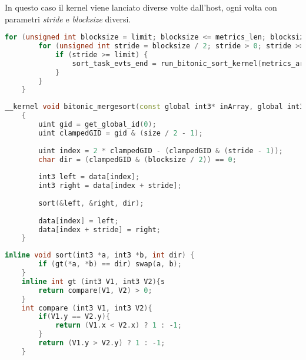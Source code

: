 In questo caso il kernel viene lanciato diverse volte dall'host, ogni volta con parametri \textit{stride} e \textit{blocksize} diversi.\\

\begin{lstlisting}[language=C++, caption={Bitonic mergesort codice host},captionpos=b]
	for (unsigned int blocksize = limit; blocksize <= metrics_len; blocksize <<= 1) {
		for (unsigned int stride = blocksize / 2; stride > 0; stride >>= 1) {
			if (stride >= limit) {
				sort_task_evts_end = run_bitonic_sort_kernel(metrics_array_len, stride, blocksize);
			}
		}
	}
\end{lstlisting}

\begin{lstlisting}[language=C++, caption={bitonic\_mergesort kernel, source: \url{https://github.com/Gram21/GPUSorting}},captionpos=b]
	__kernel void bitonic_mergesort(const global int3* inArray, global int3* outArray, const uint size, const uint blocksize, const uint stride)
	{
		uint gid = get_global_id(0);
		uint clampedGID = gid & (size / 2 - 1);
		
		uint index = 2 * clampedGID - (clampedGID & (stride - 1));
		char dir = (clampedGID & (blocksize / 2)) == 0;
		
		int3 left = data[index];
		int3 right = data[index + stride];
		
		sort(&left, &right, dir);
		
		data[index] = left;
		data[index + stride] = right;
	}
\end{lstlisting}

\begin{lstlisting}[language=C++, caption={Funzioni necessarie al kernel bitonic\_mergesort},captionpos=b]
	inline void sort(int3 *a, int3 *b, int dir) {
		if (gt(*a, *b) == dir) swap(a, b);
	}
	inline int gt (int3 V1, int3 V2){s
		return compare(V1, V2) > 0;
	}
	int compare (int3 V1, int3 V2){
		if(V1.y == V2.y){
			return (V1.x < V2.x) ? 1 : -1;
		}
		return (V1.y > V2.y) ? 1 : -1;
	}
\end{lstlisting}

